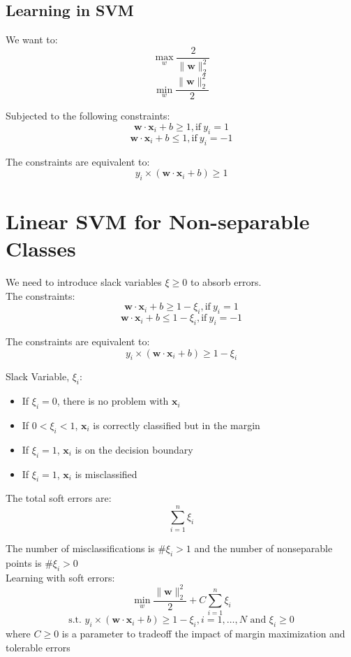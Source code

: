 \begin{multicols*}{2}
\subsection{Learning in SVM}

\noindent We want to:
$$\!\max_w \frac{2}{\| \mathbf{w} \|_2^2}$$
$$\!\min_w \frac{\| \mathbf{w} \|_2^2}{2}$$

\noindent Subjected to the following constraints:
$$\mathbf{w} \cdot \mathbf{x}_i + b \ge 1, \text{if}\ y_i=1$$
$$\mathbf{w} \cdot \mathbf{x}_i + b \le 1, \text{if}\ y_i=-1$$

\noindent The constraints are equivalent to:
$$y_i \times (\mathbf{w} \cdot \mathbf{x}_i + b) \ge 1$$

\section{Linear SVM for Non-separable Classes}

\noindent We need to introduce slack variables $\xi \ge 0$ to absorb errors. \\

\noindent The constraints:
$$\mathbf{w} \cdot \mathbf{x}_i + b \ge 1 - \xi_i, \text{if}\ y_i=1$$
$$\mathbf{w} \cdot \mathbf{x}_i + b \le 1 - \xi_i, \text{if}\ y_i=-1$$

\noindent The constraints are equivalent to:
$$y_i \times (\mathbf{w} \cdot \mathbf{x}_i + b) \ge 1 - \xi_i$$

\noindent Slack Variable, $\xi_i$:
\begin{itemize}
    \item If $\xi_i=0$, there is no problem with $\mathbf x_i$
    \item If $0<\xi_i<1$, $\mathbf x_i$ is correctly classified but in the margin
    \item If $\xi_i=1$, $\mathbf x_i$ is on the decision boundary
    \item If $\xi_i=1$, $\mathbf x_i$ is misclassified
\end{itemize}

\noindent The total soft errors are:
$$\sum_{i=1}^n \xi_i$$

\noindent The number of misclassifications is \#{$\xi_i > 1$} and the number of nonseparable points is \#{$\xi_i > 0$} \\

\noindent Learning with soft errors:
$$\!\min_w \frac{\| \mathbf{w} \|_2^2}{2} + C \sum_{i=1}^n \xi_i$$
$$\text{s.t. } y_i \times (\mathbf{w} \cdot \mathbf{x}_i + b) \ge 1 - \xi_i, i=1,\ldots,N \text{ and } \xi_i \ge 0$$
\noindent where $C \ge 0$ is a parameter to tradeoff the impact of margin maximization and tolerable errors

\end{multicols*}
